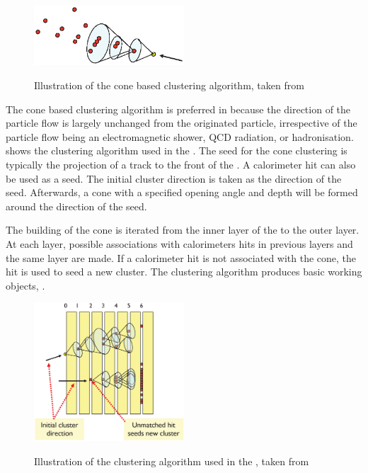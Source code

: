 \begin{figure}[tbph]
\centering
{\includegraphics[width=0.5\textwidth]{pandora/coneClustering}}%
\caption{Illustration of the cone based clustering algorithm, taken from \cite{Marshall:pandoraLC}}
\label{fig:pandoraConeClustering}
\end{figure}

The cone based clustering algorithm is preferred in \pandora because the direction of the particle flow is largely unchanged from the originated particle, irrespective of  the particle flow being an electromagnetic shower, QCD radiation, or hadronisation.  shows the clustering algorithm used in the \pandora. The seed for the cone clustering is typically the projection of a track to the front of the \ECAL. A calorimeter hit can also be used as a seed. The initial cluster direction is taken as the direction of the seed. Afterwards, a cone with a specified opening angle and depth will be formed around the direction of the seed. 

The building of the cone is iterated from the inner layer of the \ECAL to the outer layer. At each layer, possible associations with calorimeters hits in previous layers and the same layer are made. If a calorimeter hit is not associated with the cone, the hit is used to seed a new cluster. The clustering algorithm produces basic working objects, \clusters.

\begin{figure}[tbph]
\centering
{\includegraphics[width=0.5\textwidth]{pandora/coneClustering2}}%
\caption{Illustration of the clustering algorithm used  in the \pandora, taken from \cite{Marshall:pandoraLC}}
\label{fig:pandoraConeClustering2}
\end{figure}

